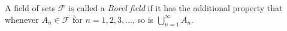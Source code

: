 A field of sets $\mathcal{F}$ is called a \textit{Borel field} if it has the additional property that whenever $A_n \in \mathcal{F}$ for $n = 1, 2, 3, \ldots$, so is $\bigcup_{n=1}^{\infty} A_n$.
